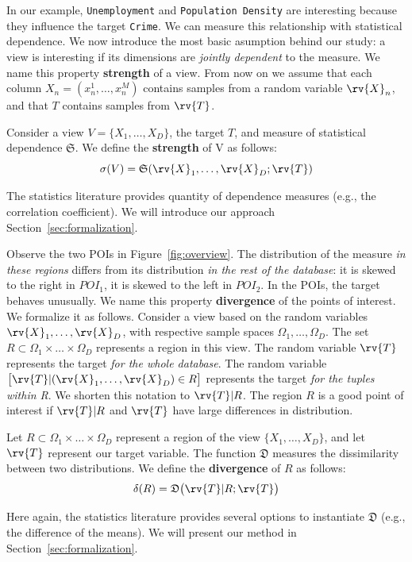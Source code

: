 In our example, \texttt{Unemployment} and \texttt{Population Density} are
interesting because they influence the target \texttt{Crime}. We can measure
this relationship with statistical dependence. We now introduce the most basic
asumption behind our study: a view is interesting if its dimensions are
\emph{jointly dependent} to the measure. We name this property
\textbf{strength} of a view. From now on we assume that each column $X_n =
(x_n^1, \ldots, x_n^M)$ contains samples from a random variable $\rv{X}_n$, and
that $T$ contains samples from $\rv{T}$.
\begin{definition}
    Consider a view $V = \{X_1, \ldots, X_D\}$, the target $T$, and measure of
    statistical dependence $\mathfrak{S}$. We define the \textbf{strength} of V
    as follows:
    \begin{equation}\label{eq:strengthgen}
        \sigma(V) = \mathfrak{S}(\rv{X}_1, \ldots, \rv{X}_D ; \rv{T})
    \end{equation}
\end{definition}
The statistics literature provides quantity of dependence measures (e.g., the
correlation coefficient). We will introduce our approach
Section~\ref{sec:formalization}.

Observe the two POIs in Figure~\ref{fig:overview}.  The distribution of the
measure \emph{in these regions} differs from its distribution \emph{in the rest
of the database}: it is skewed to the right in $POI_1$, it is skewed to the
left in $POI_2$. In the POIs, the target behaves unusually. We name this
property \textbf{divergence} of the points of interest. We formalize it as
follows. Consider a view based on the random variables $\rv{X}_1, \ldots,
\rv{X}_D$, with respective sample spaces $\Omega_1, \ldots, \Omega_D$.  The set
$R\subset \Omega_1 \times \ldots \times \Omega_D$ represents a region in this
view.  The random variable $\rv{T}$ represents the target \emph{for the whole
database}.  The random variable $\big[ \rv{T} | (\rv{X}_1, \ldots, \rv{X}_D)
\in R \big] $ represents the target \emph{for the tuples within R}. We shorten
this notation to $\rv{T} | R$. The region $R$ is a good point of interest if
$\rv{T} |R $ and $\rv{T}$ have large differences in distribution.
\begin{definition}
    Let $R\subset \Omega_1 \times \ldots \times \Omega_D$ represent a region of 
    the view $\{X_1, \ldots, X_D\}$, and let $\rv{T}$ represent our target
    variable. The function $\mathfrak{D}$ measures the dissimilarity between
    two distributions. We define the \textbf{divergence} of $R$ as follows: 
\begin{equation}\label{eq:divergencegen}
    \delta(R) = \mathfrak{D} \big( \rv{T} | R;  \rv{T}\big)
\end{equation}
\end{definition}
Here again, the statistics literature provides several options to instantiate
$\mathfrak{D}$ (e.g., the difference of the means). We will present our method
in Section~\ref{sec:formalization}.

